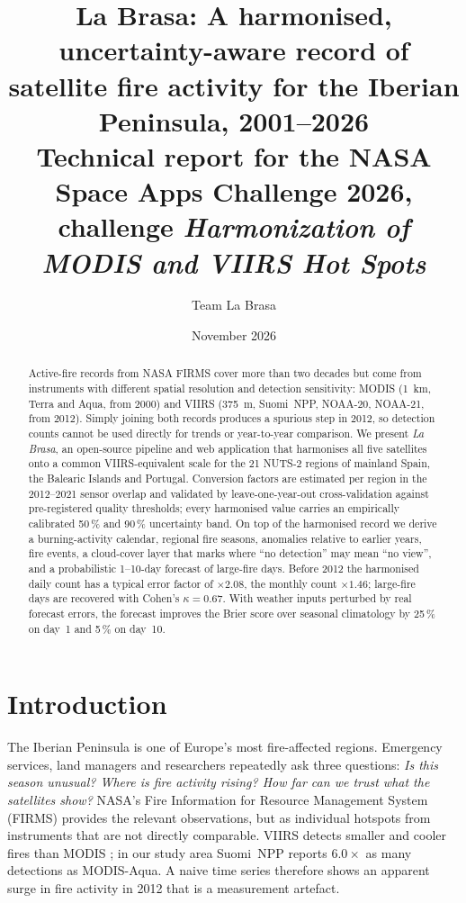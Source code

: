 \documentclass[11pt,a4paper]{article}
\title{\textbf{La Brasa}: A harmonised, uncertainty-aware record of satellite
fire activity for the Iberian Peninsula, 2001--2026\\[4pt]
\large Technical report for the NASA Space Apps Challenge 2026,\\
challenge \emph{Harmonization of MODIS and VIIRS Hot Spots}}
\author{Team La Brasa}
\date{November 2026}
\begin{document}
\maketitle

\begin{abstract}
\noindent
Active-fire records from NASA FIRMS cover more than two decades but come from instruments with different
spatial resolution and detection sensitivity: MODIS (\SI{1}{km}, Terra and Aqua, from 2000) and VIIRS
(\SI{375}{m}, Suomi~NPP, NOAA-20, NOAA-21, from 2012). Simply joining both records produces a spurious
step in 2012, so detection counts cannot be used directly for trends or year-to-year comparison.
We present \emph{La Brasa}, an open-source pipeline and web application that harmonises all five
satellites onto a common VIIRS-equivalent scale for the 21 NUTS-2 regions of mainland Spain, the Balearic
Islands and Portugal. Conversion factors are estimated per region in the 2012--2021 sensor overlap and
validated by leave-one-year-out cross-validation against pre-registered quality thresholds; every
harmonised value carries an empirically calibrated 50\,\% and 90\,\% uncertainty band. On top of the
harmonised record we derive a burning-activity calendar, regional fire seasons, anomalies relative to
earlier years, fire events, a cloud-cover layer that marks where ``no detection'' may mean ``no view'',
and a probabilistic 1--10-day forecast of large-fire days. Before 2012 the harmonised daily count has a
typical error factor of $\times 2.08$, the monthly count $\times 1.46$; large-fire days are recovered with
Cohen's $\kappa = 0.67$. With weather inputs perturbed by real forecast errors, the forecast improves the
Brier score over seasonal climatology by 25\,\% on day~1 and 5\,\% on day~10.
\end{abstract}

\section{Introduction}

The Iberian Peninsula is one of Europe's most fire-affected regions. Emergency services, land managers
and researchers repeatedly ask three questions: \emph{Is this season unusual? Where is fire activity rising?
How far can we trust what the satellites show?} NASA's Fire Information for Resource Management System
(FIRMS) provides the relevant observations, but as individual hotspots from instruments that are not
directly comparable. VIIRS detects smaller and cooler fires than MODIS
\cite{schroeder2014,giglio2016}; in our study area Suomi~NPP reports $6.0\times$ as many detections as
MODIS-Aqua. A naive time series therefore shows an apparent surge in fire activity in 2012 that is a
measurement artefact.
\end{document}
